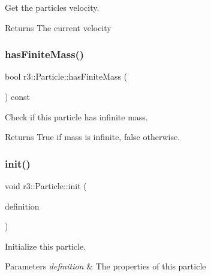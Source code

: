 Get the particle\textquotesingle{}s velocity. 

\begin{DoxyReturn}{Returns}
The current velocity 
\end{DoxyReturn}
\mbox{\label{classr3_1_1_particle_a7517367ac5587d97d783429585ec0e90}} 
\subsubsection{\texorpdfstring{has\+Finite\+Mass()}{hasFiniteMass()}}
{\footnotesize\ttfamily bool r3\+::\+Particle\+::has\+Finite\+Mass (\begin{DoxyParamCaption}{ }\end{DoxyParamCaption}) const}



Check if this particle has infinite mass. 

\begin{DoxyReturn}{Returns}
True if mass is infinite, false otherwise. 
\end{DoxyReturn}
\mbox{\label{classr3_1_1_particle_a660673cfa03f0195560df72c659b22a5}} 
\subsubsection{\texorpdfstring{init()}{init()}}
{\footnotesize\ttfamily void r3\+::\+Particle\+::init (\begin{DoxyParamCaption}\item[{const \mbox{\hyperlink{structr3_1_1_particle_def}{Particle\+Def}} \&}]{definition }\end{DoxyParamCaption})}



Initialize this particle. 


\begin{DoxyParams}{Parameters}
{\em definition} & The properties of this particle \\
\hline
\end{DoxyParams}
\mbox{\label{classr3_1_1_particle_aff134984d9bc7409579e16eca3e42b68}} 
